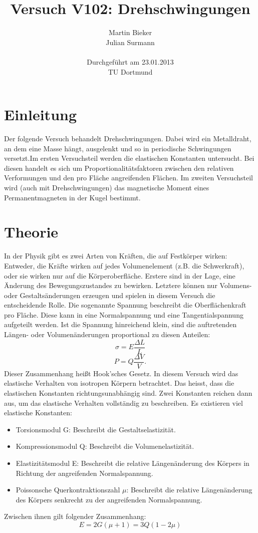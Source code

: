 \documentclass[11pt,ngerman,a4paper]{article}
\title{\textbf{Versuch V102: Drehschwingungen}}
\author{Martin Bieker\\
		Julian Surmann\\
		\\
		Durchgef\"{u}hrt am 23.01.2013\\
		TU Dortmund}
\date{}
\begin{document}
\renewcommand\tablename{Tabelle}
\renewcommand\figurename{Abbildung}
\maketitle
\thispagestyle{empty}
\newpage
\clearpage
\setcounter{page}{1}

\section{Einleitung}
Der folgende Versuch behandelt Drehschwingungen. Dabei wird ein Metalldraht, an dem eine Masse hängt, ausgelenkt und so in periodische Schwingungen versetzt.Im ersten Versuchsteil werden die elastischen Konstanten untersucht. Bei diesen handelt es sich um Proportionalitätsfaktoren zwischen den relativen Verformungen und den pro Fläche angreifenden Flächen.
Im zweiten Versuchsteil wird (auch mit Drehschwingungen) das magnetische Moment eines Permanentmagneten in der Kugel bestimmt.
\section{Theorie}
In der Physik gibt es zwei Arten von Kräften, die auf Festkörper wirken: Entweder, die Kräfte wirken auf jedes Volumenelement (z.B. die Schwerkraft), oder sie wirken nur auf die Körperoberfläche. Erstere sind in der Lage, eine Änderung des Bewegungszustandes zu bewirken. Letztere können nur Volumens- oder Gestaltsänderungen erzeugen und spielen in diesem Versuch die entscheidende Rolle. Die sogenannte Spannung beschreibt die Oberflächenkraft pro Fläche. Diese kann in eine Normalspannung und eine Tangentialspannung aufgeteilt werden. Ist die Spannung hinreichend klein, sind die auftretenden Längen- oder Volumenänderungen proportional zu diesen Anteilen:
\begin{equation}
\label{1}
\sigma = E\frac{\Delta L}{L}
\end{equation}
\begin{equation}
\label{2}
P = Q\frac{\Delta V}{V}.
\end{equation}
Dieser Zusammenhang heißt Hook'sches Gesetz.\newline
In diesem Versuch wird das elastische Verhalten von isotropen Körpern betrachtet. Das heisst, dass die elastischen Konstanten richtungsunabhängig sind. Zwei Konstanten reichen dann aus, um das elastische Verhalten vollständig zu beschreiben. Es existieren viel elastische Konstanten:
\begin{itemize}
\item Torsionsmodul G: Beschreibt die Gestaltselastizität.
\item Kompressionsmodul Q: Beschreibt die Volumenelastizität.
\item Elastizitätsmodul E: Beschreibt die relative Längenänderung des Körpers in Richtung der angreifenden Normalspannung.
\item Poissonsche Querkontraktionszahl $\mu$: Beschreibt die relative Längenänderung des Körpers senkrecht zu der angreifenden Normalspannung.
\end{itemize}
Zwischen ihnen gilt folgender Zusammenhang:
\begin{equation}
E = 2G(\mu+1)=3Q(1-2\mu)
\label{3}
\end{equation}
\end{document}

